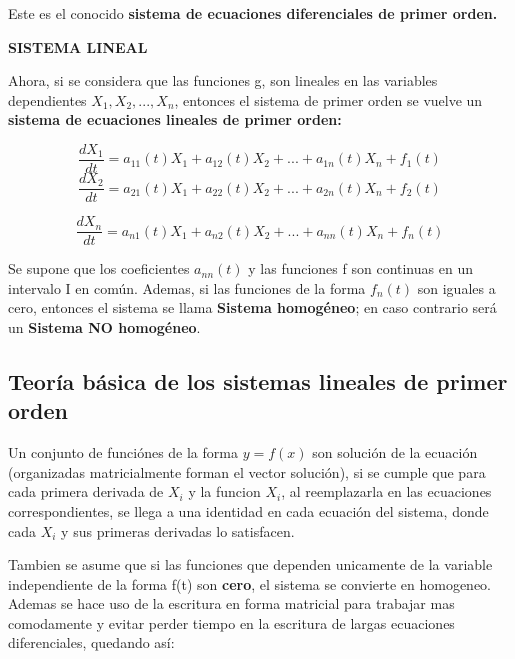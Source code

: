 \documentclass[titlepage]{article}
\begin{document}
            
        Este es el conocido \textbf{sistema de ecuaciones diferenciales de primer orden.}\cite{Zill2002}\par\vspace{0.5cm}
        
        \textbf{\large SISTEMA LINEAL}\par\vspace{0.2cm}
        
        Ahora, si se considera que las funciones g, son lineales en las variables dependientes $X_1,X_2,...,X_n$, entonces el sistema de primer orden se vuelve un \textbf{sistema de ecuaciones lineales de primer orden:}\par
        
    
        
        \begin{equation*}
            \frac{dX_1}{dt} = a_{11}(t)X_1 + a_{12}(t)X_2 + ... + a_{1n}(t)X_n + f_1(t)
        \end{equation*}
        \begin{equation*}   
           \frac{dX_2}{dt}  = a_{21}(t)X_1 + a_{22}(t)X_2 + ... + a_{2n}(t)X_n + f_2(t)
        \end{equation*}
        
        \begin{equation*}   
            \frac{dX_n}{dt} = a_{n1}(t)X_1 + a_{n2}(t)X_2 + ... + a_{nn}(t)X_n + f_n(t)
        \end{equation*}\vspace{0.2cm}
        
        Se supone que los coeficientes $a_{nn}(t)$ y las funciones f son continuas en un intervalo I en común. Ademas, si las funciones de la forma $f_n(t)$ son iguales a cero, entonces el sistema se llama \textbf{Sistema homogéneo}; en caso contrario será un \textbf{Sistema NO homogéneo}.\cite{Zill2002}
            
        \subsection{Teoría básica de los sistemas lineales de primer orden}\par\vspace{0.3cm}
        
        Un conjunto de funciónes de la forma $y = f(x)$  son solución de la ecuación (organizadas matricialmente forman el vector solución), si se cumple que para cada primera derivada de $X_i$ y la funcion $X_i$, al reemplazarla en las ecuaciones correspondientes, se llega a una identidad en cada ecuación del sistema, donde cada $X_i$ y sus primeras derivadas lo satisfacen.\par\vspace{0.4cm}
        Tambien se asume que si las funciones que dependen unicamente de la variable independiente de la forma f(t) son \textbf{cero}, el sistema se convierte en homogeneo. Ademas se hace uso de la escritura en forma matricial para trabajar mas comodamente y evitar perder tiempo en la escritura de largas ecuaciones diferenciales, quedando así:
        
\end{document}
